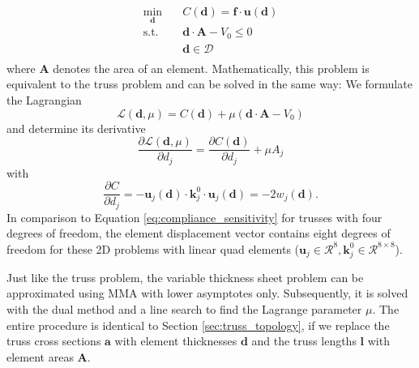 \begin{equation}
    \begin{aligned}
        \min_{\mathbf{d}} \quad & C(\mathbf{d}) = \mathbf{f} \cdot \mathbf{u}(\mathbf{d})\\
        \textrm{s.t.} \quad & \mathbf{d} \cdot \mathbf{A} - V_0 \le 0  \\
                            & \mathbf{d} \in \mathcal{D}\\
    \end{aligned}
    \label{eq:sheet_optimization}
\end{equation}
where $\mathbf{A}$ denotes the area of an element. Mathematically, this problem is equivalent to the truss problem and can be solved in the same way: We formulate the Lagrangian
\begin{equation}
    \mathcal{L}(\mathbf{d}, \mu) = C(\mathbf{d}) + \mu \left( \mathbf{d} \cdot \mathbf{A} - V_0 \right) 
    \label{eq:lagrangian_sheet_optimization}
\end{equation}
and determine its derivative
\begin{equation}
    \frac{\partial \mathcal{L} (\mathbf{d}, \mu)}{\partial d_j} 
    = \frac{\partial C(\mathbf{d})}{\partial d_j} + \mu A_j 
\end{equation}
with 
\begin{equation}
    \frac{\partial C}{\partial d_j} = - \mathbf{u}_j(\mathbf{d})  \cdot \mathbf{k}^0_j \cdot \mathbf{u}_j(\mathbf{d}) = -2w_j(\mathbf{d}).
    \label{eq:sensitivity_sheet}
\end{equation}
In comparison to Equation \eqref{eq:compliance_sensitivity} for trusses with four degrees of freedom, the element displacement vector contains eight degrees of freedom for these 2D problems with linear quad elements ($\mathbf{u}_j \in \mathcal{R}^8, \mathbf{k}^0_j \in \mathcal{R}^{8\times 8}$). 

Just like the truss problem, the variable thickness sheet problem can be approximated using MMA with lower asymptotes only. Subsequently, it is solved with the dual method and a line search to find the Lagrange parameter $\mu$. The entire procedure is identical to Section \ref{sec:truss_topology}, if we replace the truss cross sections $\mathbf{a}$ with element thicknesses $\mathbf{d}$ and the truss lengths $\mathbf{l}$ with element areas $\mathbf{A}$.

